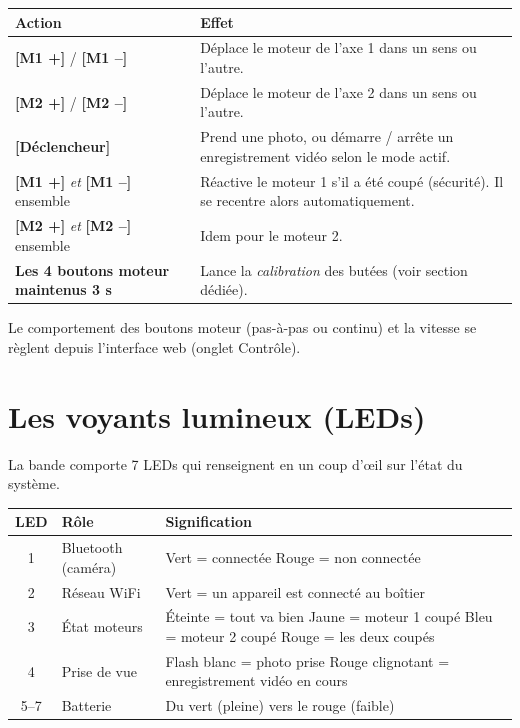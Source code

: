 \documentclass[11pt,a4paper]{article}
\newcommand{\btn}[1]{\textbf{[#1]}}
\begin{document}
\begin{center}
\begin{tabular}{>{\raggedright}p{4.5cm} p{9.5cm}}
\toprule
\textbf{Action} & \textbf{Effet} \\
\midrule
\btn{M1 +} / \btn{M1 --} & Déplace le moteur de l'axe 1 dans un sens ou l'autre. \\
\btn{M2 +} / \btn{M2 --} & Déplace le moteur de l'axe 2 dans un sens ou l'autre. \\
\btn{Déclencheur} & Prend une photo, ou démarre / arrête un enregistrement vidéo selon le mode actif. \\
\addlinespace
\btn{M1 +} \emph{et} \btn{M1 --} ensemble & Réactive le moteur 1 s'il a été coupé (sécurité). Il se recentre alors automatiquement. \\
\btn{M2 +} \emph{et} \btn{M2 --} ensemble & Idem pour le moteur 2. \\
\addlinespace
\textbf{Les 4 boutons moteur maintenus 3 s} & Lance la \emph{calibration} des butées (voir section dédiée). \\
\bottomrule
\end{tabular}
\end{center}

\noindent
Le comportement des boutons moteur (pas-à-pas ou continu) et la vitesse se
règlent depuis l'interface web (onglet Contrôle).

\section{Les voyants lumineux (LEDs)}

La bande comporte 7 LEDs qui renseignent en un coup d'\oe il sur l'état du
système.

\begin{center}
\begin{tabular}{c >{\raggedright}p{4cm} p{8.5cm}}
\toprule
\textbf{LED} & \textbf{Rôle} & \textbf{Signification} \\
\midrule
1 & Bluetooth (caméra) & Vert = connectée \quad Rouge = non connectée \\
2 & Réseau WiFi & Vert = un appareil est connecté au boîtier \\
3 & État moteurs & Éteinte = tout va bien \quad Jaune = moteur 1 coupé \quad Bleu = moteur 2 coupé \quad Rouge = les deux coupés \\
4 & Prise de vue & Flash blanc = photo prise \quad Rouge clignotant = enregistrement vidéo en cours \\
5--7 & Batterie & Du vert (pleine) vers le rouge (faible) \\
\bottomrule
\end{tabular}
\end{center}
\end{document}
